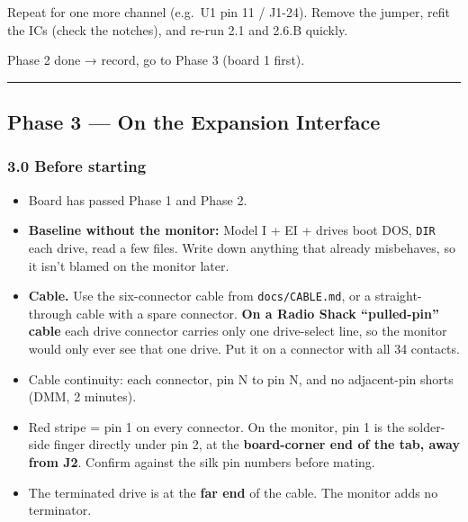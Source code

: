 \documentclass[
  10pt,
  twoside]{article}
\providecommand{\tightlist}{%
  \setlength{\itemsep}{0pt}\setlength{\parskip}{0pt}}
\begin{document}
Repeat for one more channel (e.g.~U1 pin 11 / J1-24). Remove
the jumper, refit the ICs (check the notches), and re-run
2.1 and 2.6.B quickly.

Phase 2 done → record, go to Phase 3 (board 1 first).

\begin{center}\rule{0.5\linewidth}{0.5pt}\end{center}

\hypertarget{phase-3-on-the-expansion-interface}{%
\subsection{Phase 3 --- On the Expansion
Interface}\label{phase-3-on-the-expansion-interface}}

\hypertarget{before-starting}{%
\subsubsection{3.0 Before starting}\label{before-starting}}

\begin{itemize}
\tightlist
\item[$\square$]
  Board has passed Phase 1 and Phase 2.
\item[$\square$]
  \textbf{Baseline without the monitor:} Model I + EI +
  drives boot DOS, \texttt{DIR} each drive, read a few
  files. Write down anything that already misbehaves, so it
  isn't blamed on the monitor later.
\item[$\square$]
  \textbf{Cable.} Use the six-connector cable from
  \texttt{docs/CABLE.md}, or a straight-through cable with a
  spare connector. \textbf{On a Radio Shack ``pulled-pin''
  cable} each drive connector carries only one drive-select
  line, so the monitor would only ever see that one drive.
  Put it on a connector with all 34 contacts.
\item[$\square$]
  Cable continuity: each connector, pin N to pin N, and no
  adjacent-pin shorts (DMM, 2 minutes).
\item[$\square$]
  Red stripe = pin 1 on every connector. On the monitor, pin
  1 is the solder-side finger directly under pin 2, at the
  \textbf{board-corner end of the tab, away from J2}.
  Confirm against the silk pin numbers before mating.
\item[$\square$]
  The terminated drive is at the \textbf{far end} of the
  cable. The monitor adds no terminator.
\end{itemize}
\end{document}
